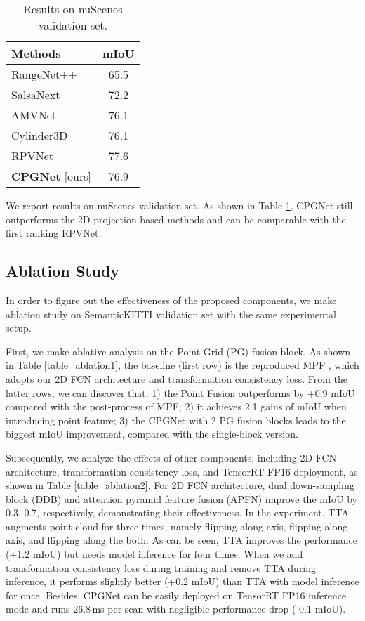 \documentclass[letterpaper, 10 pt, conference]{ieeeconf}
\begin{document}
\begin{table}[t]
\caption{Results on nuScenes validation set.}
\label{table_nuscenes}
\begin{center}
\begin{tabular}{l|c}
\hline
{\bf Methods} & {\bf mIoU} \\

\hline
RangeNet++ \cite{milioto2019rangenetplus} & 65.5 \\
SalsaNext \cite{cortinhal2020salsanext} & 72.2 \\
AMVNet \cite{liong2020amvnet} & 76.1 \\
Cylinder3D \cite{zhu2021cylindrical} & 76.1 \\
RPVNet \cite{xu2021rpvnet} & 77.6 \\

\hline
{\bf CPGNet} [ours] & 76.9 \\
\hline
\end{tabular}
\end{center}
\end{table}

We report results on nuScenes validation set. As shown in Table \ref{table_nuscenes}, CPGNet still outperforms the 2D projection-based methods and can be comparable with the first ranking RPVNet.

\subsection{Ablation Study}
In order to figure out the effectiveness of the proposed components, we make ablation study on SemanticKITTI validation set with the same experimental setup.

First, we make ablative analysis on the Point-Grid (PG) fusion block. As shown in Table \ref{table_ablation1}, the baseline (first row) is the reproduced MPF \cite{alnaggar2021multi}, which adopts our 2D FCN architecture and transformation consistency loss. From the latter rows, we can discover that: 1) the Point Fusion outperforms by +0.9 mIoU compared with the post-process of MPF; 2) it achieves 2.1 gains of mIoU when introducing point feature; 3) the CPGNet with 2 PG fusion blocks leads to the biggest mIoU improvement, compared with the single-block version.

Subsequently, we analyze the effects of other components, including 2D FCN architecture, transformation consistency loss, and TensorRT FP16 deployment, as shown in Table \ref{table_ablation2}. For 2D FCN architecture, dual down-sampling block (DDB) and attention pyramid feature fusion (APFN) improve the mIoU by 0.3, 0.7, respectively, demonstrating their effectiveness. In the experiment, TTA augments point cloud for three times, namely flipping along  axis, flipping along  axis, and flipping along the both. As can be seen, TTA improves the performance (+1.2 mIoU) but needs model inference for four times. When we add transformation consistency loss during training and remove TTA during inference, it performs slightly better (+0.2 mIoU) than TTA with model inference for once. Besides, CPGNet can be easily deployed on TensorRT FP16 inference mode and runs 26.8\,ms per scan with negligible performance drop (-0.1 mIoU).
\end{document}
